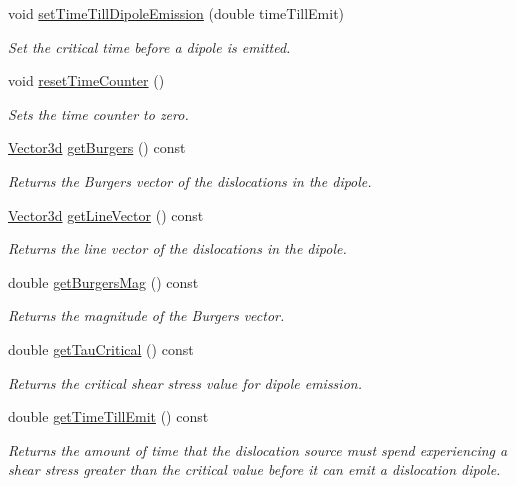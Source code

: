 \begin{DoxyCompactItemize}
void \hyperlink{classDislocationSource_ad45ae38ad94748f50d1018010e69ae90}{set\-Time\-Till\-Dipole\-Emission} (double time\-Till\-Emit)
\begin{DoxyCompactList}\small\item\em \-Set the critical time before a dipole is emitted. \end{DoxyCompactList}\item 
void \hyperlink{classDislocationSource_a621c704f4cfe28b24d84bd095de50fcf}{reset\-Time\-Counter} ()
\begin{DoxyCompactList}\small\item\em \-Sets the time counter to zero. \end{DoxyCompactList}\item 
\hyperlink{classVector3d}{\-Vector3d} \hyperlink{classDislocationSource_a47e3d707ffdecb9ecd7dd6dff47930c2}{get\-Burgers} () const 
\begin{DoxyCompactList}\small\item\em \-Returns the \-Burgers vector of the dislocations in the dipole. \end{DoxyCompactList}\item 
\hyperlink{classVector3d}{\-Vector3d} \hyperlink{classDislocationSource_ad47bab97726e7ec0591932d3f9f50271}{get\-Line\-Vector} () const 
\begin{DoxyCompactList}\small\item\em \-Returns the line vector of the dislocations in the dipole. \end{DoxyCompactList}\item 
double \hyperlink{classDislocationSource_ab272383ee903fa84f4f36104d13dfcb8}{get\-Burgers\-Mag} () const 
\begin{DoxyCompactList}\small\item\em \-Returns the magnitude of the \-Burgers vector. \end{DoxyCompactList}\item 
double \hyperlink{classDislocationSource_a570b0ddb54028fd59c6cdcc460b32a9b}{get\-Tau\-Critical} () const 
\begin{DoxyCompactList}\small\item\em \-Returns the critical shear stress value for dipole emission. \end{DoxyCompactList}\item 
double \hyperlink{classDislocationSource_ae058521ab8bd703a0cad033d4f6ec2f5}{get\-Time\-Till\-Emit} () const 
\begin{DoxyCompactList}\small\item\em \-Returns the amount of time that the dislocation source must spend experiencing a shear stress greater than the critical value before it can emit a dislocation dipole. \end{DoxyCompactList}\item 

\end{DoxyCompactItemize}
